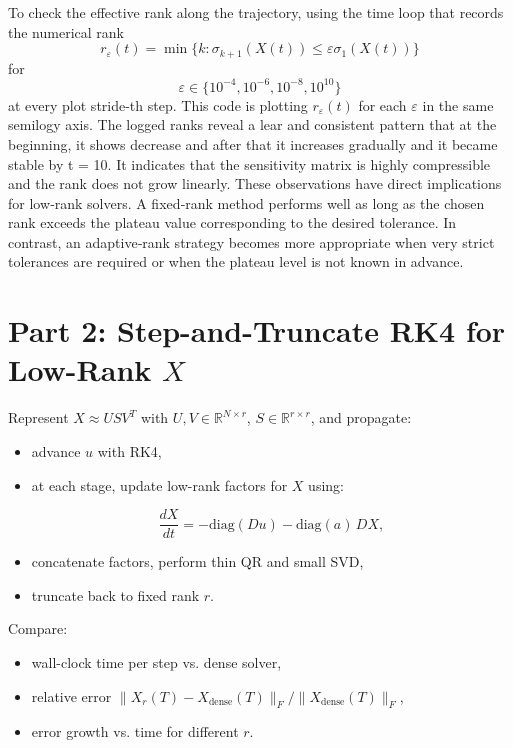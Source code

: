 \documentclass[11pt]{report}
\begin{document}
To check the effective rank along the trajectory, using the time loop that records the numerical rank
\[
r_\varepsilon(t) = \min \{ k : \sigma_{k+1}(X(t)) \leq \varepsilon \sigma_1(X(t)) \}
\]
for 
\[
\varepsilon \in \{10^{-4},10^{-6},10^{-8},10^{10}\}
\]
at every plot stride-th step. This code is plotting $r_\varepsilon(t)$ for each $\varepsilon$ in the same semilogy axis. The logged ranks reveal a lear and consistent pattern that at the beginning, it shows decrease and after that it increases gradually and it became stable by t = 10. It indicates that the sensitivity matrix is highly compressible and the rank does not grow linearly. These observations have direct implications for low‑rank solvers. A fixed‑rank method performs well as long as the chosen rank exceeds the plateau value corresponding to the desired tolerance. In contrast, an adaptive‑rank strategy becomes more appropriate when very strict tolerances are required or when the plateau level is not known in advance.


\section{Part 2: Step-and-Truncate RK4 for Low-Rank \(X\)}

Represent \(X \approx U S V^T\) with \(U,V\in\mathbb{R}^{N\times r}\), \(S\in\mathbb{R}^{r\times r}\), and propagate:
\begin{itemize}[leftmargin=*]
    \item advance \(u\) with RK4,
    \item at each stage, update low-rank factors for \(X\) using:
    

\[
    \frac{dX}{dt} = -\mathrm{diag}(D u) - \mathrm{diag}(a)\, D X,
    \]


    \item concatenate factors, perform thin QR and small SVD,
    \item truncate back to fixed rank \(r\).
\end{itemize}

Compare:
\begin{itemize}[leftmargin=*]
    \item wall-clock time per step vs. dense solver,
    \item relative error \(\|X_r(T)-X_{\text{dense}}(T)\|_F / \|X_{\text{dense}}(T)\|_F\),
    \item error growth vs. time for different \(r\).
\end{itemize}
\end{document}
